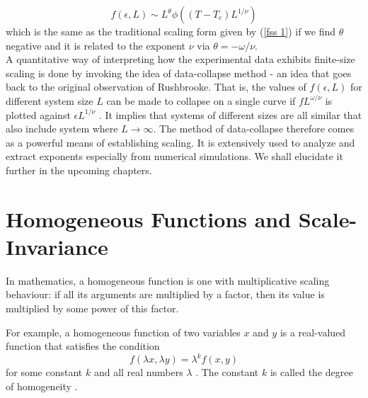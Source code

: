 	\begin{equation}
		f(\epsilon, L) \sim L^\theta \phi((T-T_c)L^{1/\nu})
	\end{equation}
	which is the same as the traditional scaling form given by (\ref{fss 1}) if we find $\theta$ negative and it is related to the exponent $\nu$ via $\theta=-\omega/\nu$.\\
	A quantitative way of interpreting how the experimental data exhibits finite-size scaling is done by invoking the idea of data-collapse method - an idea that goes back to the original observation of Rushbrooke. That is, the values of $f(\epsilon,L)$ for different system size $L$ can be	made to collapse on a single curve if $f L^{\omega/\nu}$ is plotted against $\epsilon L ^{1/\nu}$ . It	implies that systems of different sizes are all similar that also include	system where $L \rightarrow \infty$. The method of data-collapse therefore comes as	a powerful means of establishing scaling. It is extensively used to analyze and extract exponents especially from numerical simulations. We	shall elucidate it further in the upcoming chapters.
	
	
	
\section{Homogeneous Functions and Scale-Invariance}
	\label{sect:homogenious-function}
	In mathematics, a homogeneous function is one with multiplicative scaling behaviour: if all its arguments are multiplied by a factor, then its value is multiplied by some power of this factor.
	
	For example, a homogeneous function of two variables $x$ and $y$ is a real-valued function that satisfies the condition
	\begin{equation}
		f(\lambda x, \lambda y) = \lambda^k f(x,y)
	\end{equation} 
	 for some constant $k$ and all real numbers $\lambda$ . The constant  $k$ is called the degree of homogeneity \cite{Kluwer1994}.
	
	
